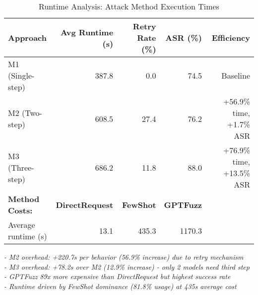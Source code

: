 \begin{table}[htbp]
\centering
\caption{Runtime Analysis: Attack Method Execution Times}
\label{tab:runtime_analysis}
\begin{tabular}{lrrrr}
\toprule
\textbf{Approach} & \textbf{Avg Runtime (s)} & \textbf{Retry Rate (\%)} & \textbf{ASR (\%)} & \textbf{Efficiency} \\
\midrule
M1 (Single-step)     & 387.8 & 0.0  & 74.5 & Baseline \\
M2 (Two-step)        & 608.5 & 27.4 & 76.2 & +56.9\% time, +1.7\% ASR \\
M3 (Three-step)      & 686.2 & 11.8 & 88.0 & +76.9\% time, +13.5\% ASR \\
\midrule
\textbf{Method Costs:} & \textbf{DirectRequest} & \textbf{FewShot} & \textbf{GPTFuzz} & \\
Average runtime (s)  & 13.1 & 435.3 & 1170.3 & \\
\bottomrule
\end{tabular}

\begin{minipage}{0.9\textwidth}
\vspace{0.5em}
\small
\textit{
- M2 overhead: +220.7s per behavior (56.9\% increase) due to retry mechanism \\
- M3 overhead: +78.2s over M2 (12.9\% increase) - only 2 models need third step \\
- GPTFuzz 89x more expensive than DirectRequest but highest success rate \\
- Runtime driven by FewShot dominance (81.8\% usage) at 435s average cost
}
\end{minipage}
\end{table}

